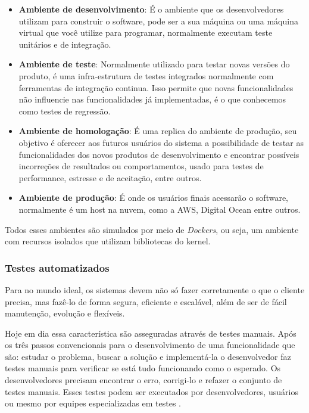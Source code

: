\begin{itemize}
  \item \textbf{Ambiente de desenvolvimento}: É o ambiente que os desenvolvedores utilizam para construir o software, pode ser a sua máquina ou uma máquina virtual que você utilize para programar, normalmente executam teste unitários e de integração.
  \item \textbf{Ambiente de teste}: Normalmente utilizado para testar novas versões do produto, é uma infra-estrutura de testes
integrados normalmente com ferramentas de integração continua. Isso permite que novas funcionalidades não influencie nas
funcionalidades já implementadas, é o que conhecemos como testes de regressão.
  \item \textbf{Ambiente de homologação}: É uma replica do ambiente de produção, seu objetivo é oferecer aos
futuros usuários do sistema a possibilidade de testar as funcionalidades dos novos produtos de desenvolvimento e
encontrar possíveis incorreções de resultados ou comportamentos, usado para testes de performance, estresse e de
aceitação, entre outros.
  \item \textbf{Ambiente de produção}: É onde os usuários finais acessarão o software, normalmente é um host na nuvem, como a AWS, Digital Ocean entre outros.
\end{itemize}

Todos esses ambientes são simulados por meio de \textit{Dockers}, ou seja, um ambiente com recursos isolados que utilizam bibliotecas do kernel.

\subsubsection{Testes automatizados}

Para \cite{kon} no mundo ideal, os sistemas devem não só fazer corretamente o que o cliente precisa, mas fazê-lo de forma segura, eficiente e escalável, além de ser de fácil manutenção, evolução e flexíveis.

Hoje em dia essa característica são asseguradas através de testes manuais. Após os três passos convencionais para o desenvolvimento de uma funcionalidade que são: estudar o problema, buscar a solução e implementá-la o desenvolvedor faz testes manuais para verificar se está tudo funcionando como o esperado. Os desenvolvedores precisam encontrar o erro, corrigi-lo e refazer o conjunto de testes manuais. Esses testes podem ser executados por desenvolvedores, usuários ou mesmo por equipes especializadas em testes \cite{kon}.

